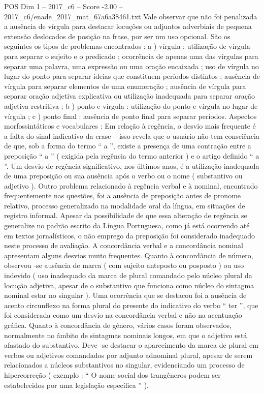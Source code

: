 \begin{textsample}{POS Dim 1 – 2017\_c6 – Score -2.00 – 2017\_c6/enade\_2017\_mat\_67a6a38461.txt}
Vale observar que não foi penalizada a ausência de vírgula para destacar locuções ou adjuntos adverbiais de pequena extensão deslocados de posição na frase, por ser um uso opcional.
São os seguintes os tipos de problemas encontrados : a ) vírgula : utilização de vírgula para separar o sujeito e o predicado ; ocorrência de apenas uma das vírgulas para separar uma palavra, uma expressão ou uma oração encaixada ; uso de vírgula no lugar do ponto para separar ideias que constituem períodos distintos ; ausência de vírgula para separar elementos de uma enumeração ; ausência de vírgula para separar oração adjetiva explicativa ou utilização inadequada para separar oração adjetiva restritiva ; b ) ponto e vírgula : utilização do ponto e vírgula no lugar de vírgula ; c ) ponto final : ausência de ponto final para separar períodos.
Aspectos morfossintáticos e vocabulares : Em relação à regência, o desvio mais frequente é a falta do sinal indicativo da crase – isso revela que o usuário não tem consciência de que, sob a forma do termo “ a ”, existe a presença de uma contração entre a preposição “ a ” ( exigida pela regência do termo anterior ) e o artigo definido “ a ”.
Um desvio de regência significativo, nos últimos anos, é a utilização inadequada de uma preposição ou sua ausência após o verbo ou o nome ( substantivo ou adjetivo ).
Outro problema relacionado à regência verbal e à nominal, encontrado frequentemente nas questões, foi a ausência de preposição antes de pronome relativo, processo generalizado na modalidade oral da língua, em situações de registro informal.
Apesar da possibilidade de que essa alteração de regência se generalize no padrão escrito da Língua Portuguesa, como já está ocorrendo até em textos jornalísticos, o não emprego da preposição foi considerado inadequado neste processo de avaliação.
A concordância verbal e a concordância nominal apresentam alguns desvios muito frequentes.
Quanto à concordância de número, observou -se ausência de marca ( com sujeito anteposto ou posposto ) ou uso indevido ( uso inadequado da marca de plural comandado pelo núcleo plural da locução adjetiva, apesar de o substantivo que funciona como núcleo do sintagma nominal estar no singular ).
Uma ocorrência que se destacou foi a ausência de acento circunflexo na forma plural do presente do indicativo do verbo “ ter ”, que foi considerada como um desvio na concordância verbal e não na acentuação gráfica.
Quanto à concordância de gênero, vários casos foram observados, normalmente no âmbito de sintagmas nominais longos, em que o adjetivo está afastado do substantivo.
Deve -se destacar o aparecimento da marca de plural em verbos ou adjetivos comandados por adjunto adnominal plural, apesar de serem relacionados a núcleos substantivos no singular, evidenciando um processo de hipercorreção ( exemplo : “ O nome social dos trangêneros podem ser estabelecidos por uma legislação específica ” ).

\end{textsample}
